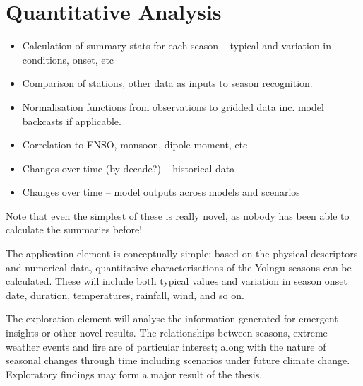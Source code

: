 \section{Quantitative Analysis}

\begin{itemize}
\item Calculation of summary stats for each season – typical and variation in conditions, onset, etc
\item Comparison of stations, other data as inputs to season recognition.
\item Normalisation functions from observations to gridded data inc. model backcasts if applicable.
\item Correlation to ENSO, monsoon, dipole moment, etc
\item Changes over time (by decade?) – historical data
\item Changes over time – model outputs across models and scenarios
\end{itemize}

Note that even the simplest of these is really novel, as nobody has
been able to calculate the summaries before!

The application element is conceptually simple:  based on the physical
descriptors and numerical data, quantitative characterisations of the
Yolngu seasons can be calculated.  These will include both typical values
and variation in season onset date, duration, temperatures, rainfall,
wind, and so on.

The exploration element will analyse the information generated for emergent
insights or other novel results.  The relationships between seasons, extreme
weather events and fire are of particular interest; along with the nature of
seasonal changes through time including scenarios under future climate change.
Exploratory findings may form a major result of the thesis.





